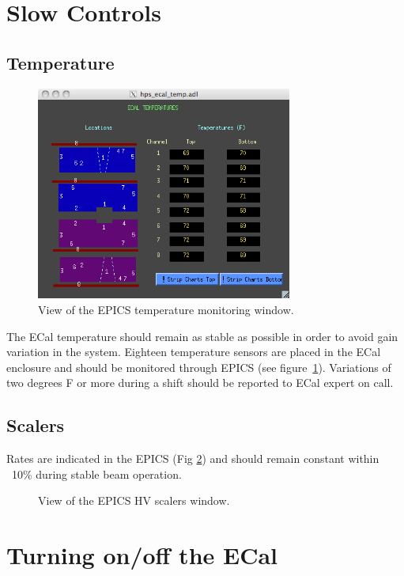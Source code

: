 \documentclass[12pt]{article}
\begin{document}
   \section{Slow Controls}

      \subsection{Temperature}

\begin{figure}
\center
\includegraphics[width=0.75\textwidth]{ECal_temp_monitor.png}
\caption{\small \label{temp} View of the EPICS temperature monitoring window.}
\end{figure}
      
         The ECal temperature should remain as stable as possible in order to avoid gain variation in the system. Eighteen temperature sensors are placed in the ECal enclosure and should be monitored through EPICS (see figure~\ref{temp}). Variations of two degrees F or more during a shift should be reported to ECal expert on call.

      \subsection{Scalers}

         Rates are indicated in the EPICS (Fig \ref{Scalers}) and should remain constant within ~10\% during stable beam operation.

\begin{figure}
\center
\caption{\small \label{Scalers} View of the EPICS HV scalers window.}
\end{figure}

   \section{Turning on/off the ECal}
\end{document}
